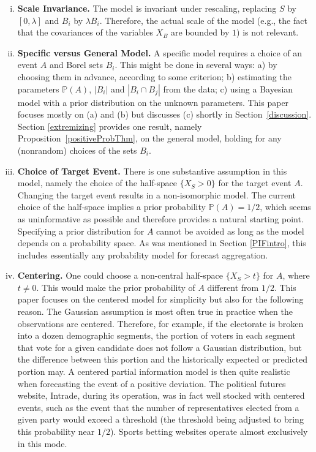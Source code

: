 \documentclass[11pt]{article}
\renewcommand{\P}{\mathbb{P}}
\theoremstyle{definition}
\theoremstyle{definition}
\def\P{{\mathbb P}}
\begin{document}
\begin{enumerate}[(i)]
\item {\bf Scale Invariance.} The model is invariant under rescaling,
replacing $S$ by $[0,\lambda]$ and $B_i$ by $\lambda B_i$.  Therefore,
the actual scale of the model (e.g., the fact that the covariances of
the variables $X_B$ are bounded by $1$) is not relevant.


\item {\bf Specific versus General Model.} A specific model requires a
choice of an event $A$ and Borel sets $B_i$.
This might be done in several ways: a) by choosing them in advance,
according to some criterion; b) estimating the parameters $\P(A)$,
$|B_i|$ and $|B_i \cap B_j|$ from the data; c) using a Bayesian model
with a prior distribution on the unknown parameters.  This paper
focuses mostly on (a) and (b) but discusses (c) shortly in
Section~\ref{discussion}.  Section \ref{extremizing} provides one
result, namely Proposition~\ref{positiveProbThm}, on the general
model, holding for any (nonrandom) choices of the sets $B_i$.
\label{item:specific}






\item {\bf Choice of Target Event.}  There is one substantive
assumption in this model, namely the choice of the half-space $\{ X_S
> 0 \}$ for the target event $A$.  Changing the target event results
in a non-isomorphic model. The current choice of the half-space
implies a prior probability $\P(A) = 1/2$, which seems as
uninformative as possible and therefore provides a natural starting
point. Specifying a prior distribution for $A$ cannot be avoided as
long as the model depends on a probability space. As was mentioned in
Section \ref{PIFintro}, this includes essentially any probability
model for forecast aggregation.

\item {\bf Centering.} One could choose a non-central half-space $\{
X_S > t \}$ for $A$, where $t \neq 0$.  This would make the prior
probability of $A$ different from $1/2$.  This paper focuses on the
centered model for simplicity but also for the following reason.  The
Gaussian assumption is most often true in practice when the
observations are centered.  Therefore, for example, if the electorate
is broken into a dozen demographic segments, the portion of voters in
each segment that vote for a given candidate does not follow a
Gaussian distribution, but the difference between this portion and the
historically expected or predicted portion may.  A centered partial
information model is then quite realistic when forecasting the event
of a positive deviation.  The political futures website, Intrade,
during its operation, was in fact well stocked with centered events,
such as the event that the number of representatives elected from a
given party would exceed a threshold (the threshold being adjusted to
bring this probability near $1/2$).  Sports betting websites operate
almost exclusively in this mode.
\label{item:centered}
\end{enumerate}
\end{document}
